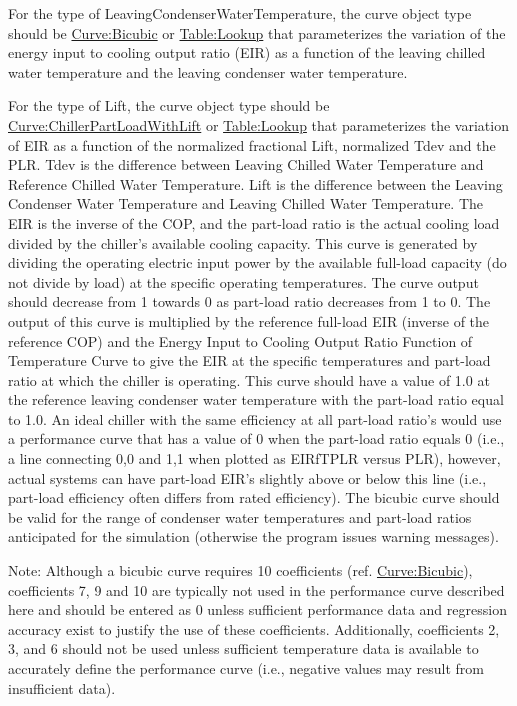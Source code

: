 For the type of LeavingCondenserWaterTemperature, the curve object type should be \hyperref[curvebicubic]{Curve:Bicubic} or \hyperref[tablelookup]{Table:Lookup} that parameterizes
the variation of the energy input to cooling output ratio (EIR) as a function of the leaving chilled water temperature and the leaving condenser water temperature.

For the type of Lift, the curve object type should be \hyperref[curvechillerpartloadwithlift]{Curve:ChillerPartLoadWithLift} or \hyperref[tablelookup]{Table:Lookup} that parameterizes the variation of EIR
as a function of the normalized fractional Lift, normalized Tdev and the PLR. Tdev is the difference between Leaving Chilled Water Temperature and Reference Chilled Water Temperature.
Lift is the difference between the Leaving Condenser Water Temperature and Leaving Chilled Water Temperature.
The EIR is the inverse of the COP, and the part-load ratio is the actual cooling load divided by the chiller's available cooling capacity.
This curve is generated by dividing the operating electric input power by the available full-load capacity (do not divide by load) at the specific operating temperatures.
The curve output should decrease from 1 towards 0 as part-load ratio decreases from 1 to 0.
The output of this curve is multiplied by the reference full-load EIR (inverse of the reference COP) and the Energy Input to Cooling Output Ratio Function of Temperature Curve
to give the EIR at the specific temperatures and part-load ratio at which the chiller is operating.
This curve should have a value of 1.0 at the reference leaving condenser water temperature with the part-load ratio equal to 1.0.
An ideal chiller with the same efficiency at all part-load ratio's would use a performance curve that has a value of 0 when the part-load ratio equals 0
(i.e., a line connecting 0,0 and 1,1 when plotted as EIRfTPLR versus PLR), however, actual systems can have part-load EIR's slightly above or below this line
(i.e., part-load efficiency often differs from rated efficiency). The bicubic curve should be valid for the range of condenser water temperatures
and part-load ratios anticipated for the simulation (otherwise the program issues warning messages).

Note: Although a bicubic curve requires 10 coefficients (ref. \hyperref[curvebicubic]{Curve:Bicubic}), coefficients 7, 9 and 10 are typically not used in the performance curve described here and should be entered as 0 unless sufficient performance data and regression accuracy exist to justify the use of these coefficients. Additionally, coefficients 2, 3, and 6 should not be used unless sufficient temperature data is available to accurately define the performance curve (i.e., negative values may result from insufficient data).

